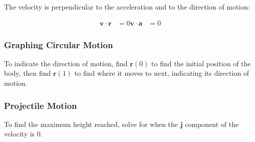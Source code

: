 \documentclass[a4paper,11pt]{article}
\newcommand{\bb}{\boldsymbol}
\begin{document}
The velocity is perpendicular to the acceleration and to the direction of
motion:

$$
\begin{aligned}
\bb{v} \cdot \bb{r} & = 0
\bb{v} \cdot \bb{a} & = 0
\end{aligned}
$$


\subsubsection{Graphing Circular Motion}

To indicate the direction of motion, find $\bb{r}(0)$ to find the initial
position of the body, then find $\bb{r}(1)$ to find where it moves to next,
indicating its direction of motion.


\subsubsection{Projectile Motion}

To find the maximum height reached, solve for when the $\bb{j}$ component of
the velocity is 0.
\end{document}
